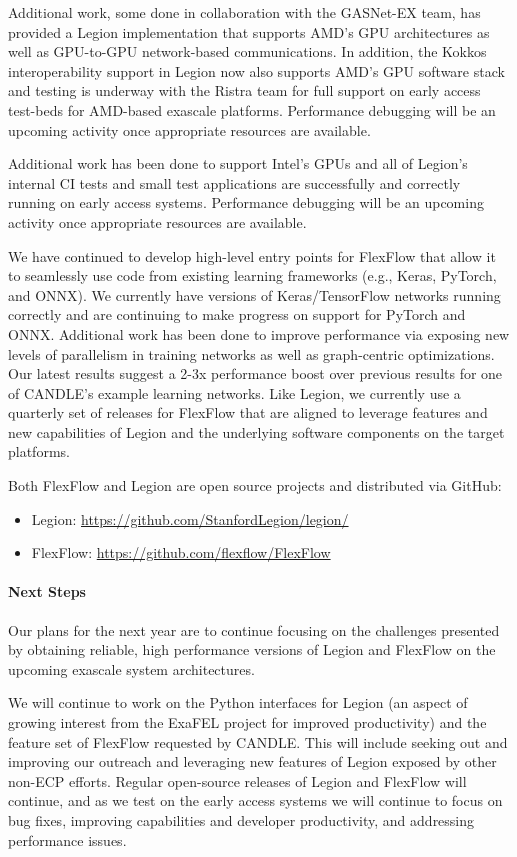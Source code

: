 Additional work, some done in collaboration with the GASNet-EX team, has provided a Legion implementation that
supports AMD's GPU architectures as well as GPU-to-GPU network-based
communications.  In addition, the Kokkos interoperability support in
Legion now also supports AMD's GPU software stack and testing is
underway with the Ristra team for full support on early access
test-beds for AMD-based exascale platforms.  Performance debugging will
be an upcoming activity once appropriate resources are available.

Additional work has been done to support Intel's GPUs and all of
Legion's internal CI tests and small test applications are
successfully and correctly running on early access systems.
Performance debugging will be an upcoming activity once appropriate
resources are available.

We have continued to develop high-level entry points for FlexFlow that
allow it to seamlessly use code from existing learning frameworks (e.g.,
Keras, PyTorch, and ONNX).  We currently have versions of Keras/TensorFlow
networks running correctly and are continuing to make progress on support
for PyTorch and ONNX.   Additional work has been done to improve performance
via exposing new levels of parallelism in training networks as well as
graph-centric optimizations.  Our latest results suggest a 2-3x performance
boost over previous results for one of CANDLE's example learning networks.
Like Legion, we currently use a quarterly set of releases for FlexFlow that
are aligned to leverage features and new capabilities of Legion and the
underlying software components on the target platforms. 

Both FlexFlow and Legion are open source projects and distributed via GitHub:

\begin{itemize}
  \item Legion: \url{https://github.com/StanfordLegion/legion/}
  \item FlexFlow: \url{https://github.com/flexflow/FlexFlow} 
\end{itemize}

\paragraph{Next Steps}

Our plans for the next year are to continue focusing on the challenges
presented by obtaining reliable, high performance versions of Legion and
FlexFlow on the upcoming exascale system architectures.  

We will continue to work on the Python interfaces for Legion (an aspect
of growing interest from the ExaFEL project for improved productivity)
and the feature set of FlexFlow requested by CANDLE.  This will include
seeking out and improving our outreach and leveraging new features of
Legion exposed by other non-ECP efforts.  Regular open-source releases of
Legion and FlexFlow will continue, and as we test on the early access
systems we will continue to focus on bug fixes, improving capabilities and 
developer productivity, and addressing performance issues. 





